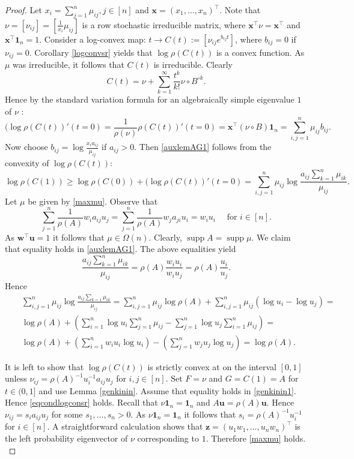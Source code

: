\documentclass{amsart}
\newcommand{\supp}[1]{\operatorname{supp}{#1}}
\newcommand{\uu}{\mathbf{u}}
\newcommand{\w}{\mathbf{w}}
\newcommand{\x}{\mathbf{x}}
\newcommand{\z}{\mathbf{z}}
\newcommand{\0}{\mathbf{0}}
\newcommand{\1}{\mathbf{1}}
\newcommand{\trans}{^\top}
\theoremstyle{remark}
\numberwithin{equation}{section} %
\renewcommand{\ge}{\geqslant}
\begin{document}
\begin{proof} Let $x_i=\sum_{j=1}^n \mu_{ij},j\in[n]$ and $\x=(x_1,\ldots,x_n)\trans$.  Note that
$\nu=[\nu_{ij}]=[\frac{1}{x_i}\mu_{ij}]$ is a row stochastic irreducible matrix, where $\x\trans \nu=\x\trans$ and $\x\trans\1_n=1$.   Consider a log-convex map: $t\to C(t):=[\nu_{ij}e^{b_{ij}t}]$, where $b_{ij}=0$ if $\nu_{ij}=0$.  Corollary \ref{logconvsr} yields that $\log\rho(C(t))$ is a convex function.  As $\mu$ was irreducible, it follows that $C(t)$ is irreducible. Clearly 
\[C(t)=\nu +\sum_{k=1}^{\infty} \frac{t^k}{k!} \nu\circ B^{\circ k}.\]
Hence by the standard variation formula for an algebraically simple eigenvalue $1$ of $\nu$ \cite[\S3.8]{Fribook}:
\[(\log\rho(C(t))'(t=0)=\frac{1}{\rho(\nu)}\rho(C(t))'(t=0) =\x\trans (\nu\circ B)\1_n=\sum_{i,j=1}^n \mu_{ij} b_{ij}.\]
Now choose $b_{ij}=\log \frac{x_i a_{ij}}{\mu_{ij}}$ if $a_{ij}>0$.  Then \eqref{auxlemAG1} follows from the convexity of $\log\rho(C(t))$:
\[\log \rho(C(1))\ge \log\rho(C(0))+(\log\rho(C(t))'(t=0)=\sum_{i,j=1}^n \mu_{ij}\log \frac{a_{ij}\sum_{k=1}^n \mu_{ik}}{\mu_{ij}}.\]
Let $\mu$ be given by \eqref{maxmu}.   Observe that 
\[\sum_{j=1}^n \frac{1}{\rho(A)} w_ia_{ij}u_j=\sum_{j=1}^n \frac{1}{\rho(A)}w_j a_{ji}u_i=w_iu_i \quad \textrm{ for } i\in[n].\]
As $\w\trans \uu=1$ it follows that $\mu\in\Omega(n)$.  Clearly, $\supp A= \supp \mu$.
We claim that equality holds in \eqref{auxlemAG1}.   The above equalities yield 
\[\frac{a_{ij}\sum_{k=1}^n \mu_{ik}}{\mu_{ij}}=\rho(A)\frac{w_iu_i}{w_iu_j}=\rho(A)\frac{u_i}{u_j}.\]
Hence
\begin{eqnarray*}
&&\sum_{i,j=1}^n \mu_{ij}\log\frac{a_{ij}\sum_{k=1}\mu_{ik}}{\mu_{ij}}=\sum_{i,j=1}^n \mu_{ij}\log\rho(A) +\sum_{i,j=1}^n \mu_{ij} (\log u_i - \log u_j)=\\
&&\log\rho(A)+\left(\sum_{i=1}^n \log u_i\sum_{j=1}^n \mu_{ij}-\sum_{j=1}^n \log u_j\sum_{i=1}^n \mu_{ij}\right)=\\
&&\log\rho(A) +\left(\sum_{i=1}^n w_iu_i\log u_i\right) -
\left(\sum_{j=1}^n w_ju_j\log u_j\right)=\log\rho(A).
\end{eqnarray*}
 
{It is left to show that $\log\rho(C(t))$ is strictly convex at on the interval $[0,1]$ unless $\nu_{ij}=\rho(A)^{-1}u_i^{-1}a_{ij}u_j$ for $i,j\in[n]$.  Set $F=\nu$ and $G=C(1)=A$ for $t\in (0,1]$ and use Lemma \ref{genkinin}.  Assume that  equality holds in \eqref{genkinin1}.  Hence \eqref{eqcondlogconsr} holds.  Recall that $\nu \1_n=\1_n$ and $A\uu=\rho(A)\uu$. Hence $\nu_{ij}=s_ia_{ij}u_j$ for some $s_1,\ldots,s_n>0$.  As $\nu\1_n=\1_n$ it follows that $s_i=\rho(A)^{-1}u_i^{-1}$ for $i\in [n]$. A straightforward calculation shows that $\z=(u_1w_1,\ldots,u_nw_n)\trans$ is the left probability eigenvector of $\nu$ corresponding to $1$.  Therefore \eqref{maxmu} holds. }
\end{proof}
\end{document}
